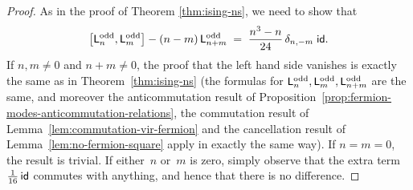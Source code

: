 \documentclass[12pt,oneside,english]{amsart}
\numberwithin{equation}{section}
\numberwithin{figure}{section}
\theoremstyle{plain}
\theoremstyle{plain}
\theoremstyle{plain}
\theoremstyle{plain}
\theoremstyle{remark}
\theoremstyle{definition}
\theoremstyle{plain}
\theoremstyle{plain}
\numberwithin{thm}{section}
\begin{document}
\begin{proof}
As in the proof of Theorem \ref{thm:ising-ns}, we need to show that
\[
\big[ \mathsf{L}_{n}^{\mathrm{odd}} , \mathsf{L}_{m}^{\mathrm{odd}} \big]
    - (n-m) \, \mathsf{L}_{n+m}^{\mathrm{odd}}
\; = \; \frac{n^3-n}{24} \, \delta_{n,-m} \; \mathsf{id} .
\]
If $n,m\neq0$ and $n+m\neq0$, the proof that the left hand side
vanishes is exactly the same as in %
Theorem~\ref{thm:ising-ns}
(the formulas for 
$\mathsf{L}_{n}^{\mathrm{odd}}, \mathsf{L}_{m}^{\mathrm{odd}}, \mathsf{L}_{n+m}^{\mathrm{odd}}$ are the same, 
and moreover the anticommutation
result of Proposition~\ref{prop:fermion-modes-anticommutation-relations},
the commutation result of Lemma~\ref{lem:commutation-vir-fermion} and the
cancellation result of Lemma~\ref{lem:no-fermion-square} apply in exactly the 
same way). If $n=m=0$, the result is trivial. If either~$n$ or~$m$ is zero, 
simply observe that the extra term $\frac{1}{16} \, \mathsf{id}$
commutes with anything, and hence that there is no difference.


\end{proof}
\end{document}
